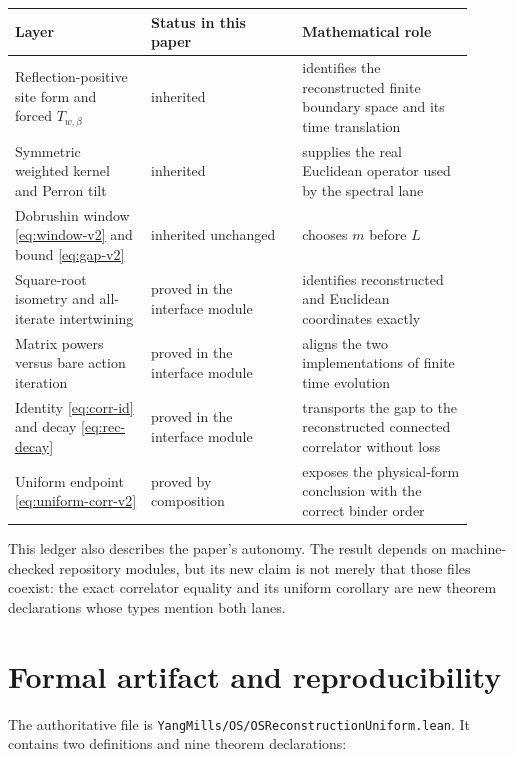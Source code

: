 \documentclass[11pt]{article}
\begin{document}
\begin{center}
\small
\begin{tabular}{@{}P{0.27\linewidth}P{0.30\linewidth}P{0.34\linewidth}@{}}
\toprule
Layer & Status in this paper & Mathematical role \\
\midrule
Reflection-positive site form and forced $T_{w,\beta}$ & inherited & identifies the reconstructed finite boundary space and its time translation \\
Symmetric weighted kernel and Perron tilt & inherited & supplies the real Euclidean operator used by the spectral lane \\
Dobrushin window \eqref{eq:window-v2} and bound \eqref{eq:gap-v2} & inherited unchanged & chooses $m$ before $L$ \\
Square-root isometry and all-iterate intertwining & proved in the interface module & identifies reconstructed and Euclidean coordinates exactly \\
Matrix powers versus bare action iteration & proved in the interface module & aligns the two implementations of finite time evolution \\
Identity \eqref{eq:corr-id} and decay \eqref{eq:rec-decay} & proved in the interface module & transports the gap to the reconstructed connected correlator without loss \\
Uniform endpoint \eqref{eq:uniform-corr-v2} & proved by composition & exposes the physical-form conclusion with the correct binder order \\
\bottomrule
\end{tabular}
\end{center}

This ledger also describes the paper's autonomy.  The result depends on
machine-checked repository modules, but its new claim is not merely that those
files coexist: the exact correlator equality and its uniform corollary are
new theorem declarations whose types mention both lanes.

\section{Formal artifact and reproducibility}

The authoritative file is
\texttt{YangMills/OS/OSReconstructionUniform.lean}.  It contains two
definitions and nine theorem declarations:
\end{document}
